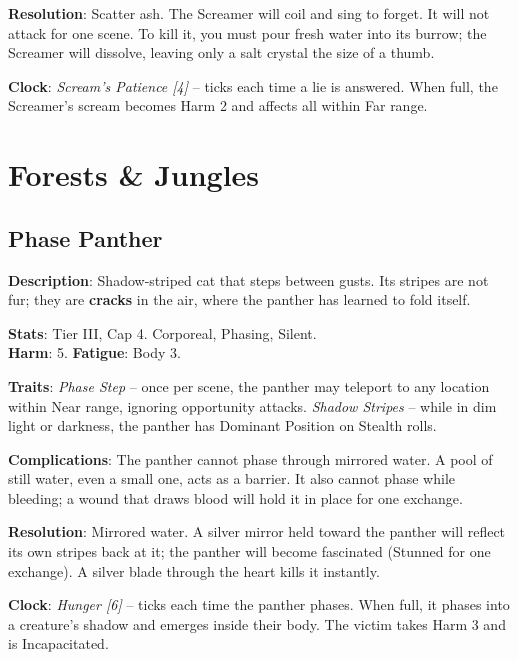 \noindent\textbf{Resolution}: Scatter ash. The Screamer will coil and sing to forget. It will not attack for one scene. To kill it, you must pour fresh water into its burrow; the Screamer will dissolve, leaving only a salt crystal the size of a thumb.

\noindent\textbf{Clock}: \emph{Scream's Patience [4]} -- ticks each time a lie is answered. When full, the Screamer's scream becomes Harm 2 and affects all within Far range.


\section*{Forests & Jungles}

\subsection*{Phase Panther}

\noindent\textbf{Description}: Shadow-striped cat that steps between gusts. Its stripes are not fur; they are \textbf{cracks} in the air, where the panther has learned to fold itself.

\noindent\textbf{Stats}: Tier III, Cap 4. Corporeal, Phasing, Silent.\\
\textbf{Harm}: 5. \textbf{Fatigue}: Body 3.

\noindent\textbf{Traits}: 
\emph{Phase Step} -- once per scene, the panther may teleport to any location within Near range, ignoring opportunity attacks. \emph{Shadow Stripes} -- while in dim light or darkness, the panther has Dominant Position on Stealth rolls.

\noindent\textbf{Complications}: The panther cannot phase through mirrored water. A pool of still water, even a small one, acts as a barrier. It also cannot phase while bleeding; a wound that draws blood will hold it in place for one exchange.

\noindent\textbf{Resolution}: Mirrored water. A silver mirror held toward the panther will reflect its own stripes back at it; the panther will become fascinated (Stunned for one exchange). A silver blade through the heart kills it instantly.

\noindent\textbf{Clock}: \emph{Hunger [6]} -- ticks each time the panther phases. When full, it phases into a creature's shadow and emerges inside their body. The victim takes Harm 3 and is Incapacitated.

